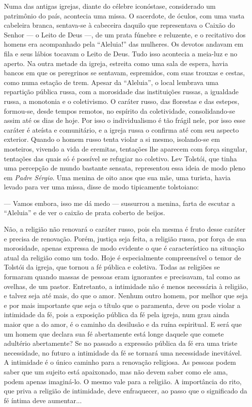 Numa das antigas igrejas, diante do célebre iconóstase, considerado um
patrimônio do país, acontecia uma missa. O sacerdote, de óculos, com uma
vasta cabeleira branca, sentava-se à cabeceira daquilo que representava
o Caixão do Senhor --- o Leito de Deus ---, de um prata fúnebre e
reluzente, e o recitativo dos homens era acompanhado pela ``Aleluia!''
das mulheres. Os devotos andavam em fila e seus lábios tocavam o Leito
de Deus. Tudo isso acontecia a meia-luz e no aperto. Na outra metade da
igreja, estreita como uma sala de espera, havia bancos em que os
peregrinos se sentavam, espremidos, com suas trouxas e cestas, como numa
estação de trem. Apesar da ``Aleluia'', o local lembrava uma repartição
pública russa, com a morosidade das instituições russas, a igualdade
russa, a monotonia e o coletivismo. O caráter russo, das florestas e das
estepes, formou-se, desde tempos remotos, no espírito da coletividade,
consolidando-se assim até os dias de hoje. Por isso o individualismo é
tão frágil nele, por isso esse caráter é ateísta e comunitário, e a
igreja russa o confirma até com seu aspecto exterior. Quando o homem
russo tenta violar a si mesmo, isolando-se em mosteiros, vivendo a vida
de eremitas, tentações lhe aparecem com força singular, tentações das
quais só é possível se refugiar no coletivo. Lev Tolstói, que tinha uma
percepção de mundo bastante sensata, representou essa ideia de modo
pleno em \emph{Padre Sérgio}. Uma menina de oito anos que sua mãe, uma
turista, havia levado para ver uma missa, disse de modo tipicamente
tolstoiano:

--- Vamos embora, isso me dá medo --- sussurrou a menina, farta de
escutar a ``Aleluia'' e de ver o caixão de prata coberto de beijos.

Não, a religião não renovará o caráter russo, pois ela mesma é fruto
desse caráter e precisa de renovação. Porém, justiça seja feita, a
religião russa, por força de sua morosidade, apenas expressa de modo
evidente o que é característico na situação atual da religião como um
todo. Hoje é especialmente compreensível o temor de Tolstói da igreja,
que tornou a fé pública e coletiva. Todas as religiões se formaram
quando massas de pessoas eram ignorantes e precisavam, tal como as
ovelhas, de um pastor. Entretanto, a intimidade não é menos necessária à
religião, e talvez seja até mais, do que o amor. Nenhum outro homem, por
melhor que seja e por mais importante que seja o título que o paramenta,
deve ou pode violar a intimidade da fé, pois a exposição pública da fé
pela igreja, num grau ainda maior que a do amor, é o caminho da
desilusão e da ruína espiritual. E será que um homem que declara sua fé
abertamente está longe daquele que comete adultério abertamente? Se no
passado a expressão pública da fé era uma triste necessidade, no futuro
a intimidade da fé se tornará uma necessidade inevitável. A intimidade é
o único caminho para a renovação religiosa. As pessoas podem saber que
um sujeito está apaixonado, mas não devem saber como ele ama, podem
apenas imaginá-lo. O mesmo vale para a religião. A importância do rito,
que priva a religião de intimidade, deve enfraquecer, ao passo que o
significado da fé íntima deve aumentar...

